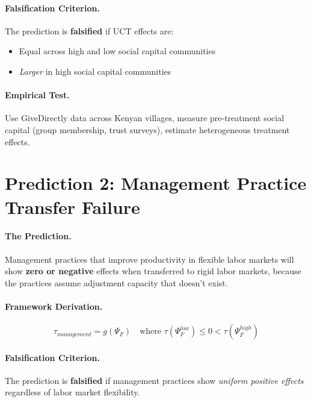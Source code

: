 \paragraph{Falsification Criterion.}
The prediction is \textbf{falsified} if UCT effects are:
\begin{itemize}
    \item Equal across high and low social capital communities
    \item \textit{Larger} in high social capital communities
\end{itemize}

\paragraph{Empirical Test.}
Use GiveDirectly data across Kenyan villages, measure pre-treatment social capital (group membership, trust surveys), estimate heterogeneous treatment effects.


\section{Prediction 2: Management Practice Transfer Failure}
\label{sec:S-prediction2}

\paragraph{The Prediction.}
Management practices that improve productivity in flexible labor markets will show \textbf{zero or negative} effects when transferred to rigid labor markets, because the practices assume adjustment capacity that doesn't exist.

\paragraph{Framework Derivation.}
\begin{equation}
    \tau_{management} = g(\Psi_F) \quad \text{where } \tau(\Psi_F^{low}) \leq 0 < \tau(\Psi_F^{high})
\end{equation}

\paragraph{Falsification Criterion.}
The prediction is \textbf{falsified} if management practices show \textit{uniform positive effects} regardless of labor market flexibility.


